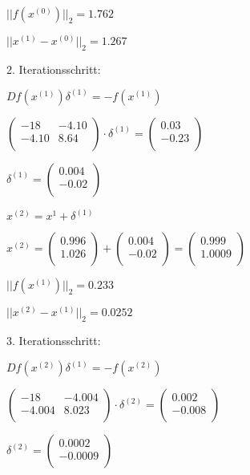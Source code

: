 \documentclass{article}
\begin{document}
\(||f(x^{(0)})||_2 = 1.762\)

\(||x^{(1)}-x^{(0)}||_2 = 1.267\)

2. Iterationsschritt:

\(Df(x^{(1)})\delta^{(1)} = -f(x^{(1)})\)

\(
\begin{pmatrix}
-18 & -4.10\\
-4.10 & 8.64\\
\end{pmatrix}
\cdot
\delta^{(1)}
=
\begin{pmatrix}
0.03\\
-0.23\\
\end{pmatrix}
\)

\(
\delta^{(1)}
=
\begin{pmatrix}
0.004\\
-0.02\\
\end{pmatrix}
\)

\(x^{(2)} = x^{1} + \delta^{(1)}\)

\(
x^{(2)}
=
\begin{pmatrix}
0.996\\
1.026\\
\end{pmatrix}
+
\begin{pmatrix}
0.004\\
-0.02\\
\end{pmatrix}
=
\begin{pmatrix}
0.999\\
1.0009\\
\end{pmatrix}
\)

\(||f(x^{(1)})||_2 = 0.233\)

\(||x^{(2)}-x^{(1)}||_2 = 0.0252\)

3. Iterationsschritt:

\(Df(x^{(2)})\delta^{(1)} = -f(x^{(2)})\)

\(
\begin{pmatrix}
-18 & -4.004\\
-4.004 & 8.023\\
\end{pmatrix}
\cdot
\delta^{(2)}
=
\begin{pmatrix}
0.002\\
-0.008\\
\end{pmatrix}
\)

\(
\delta^{(2)}
=
\begin{pmatrix}
0.0002\\
-0.0009\\
\end{pmatrix}
\)
\end{document}
